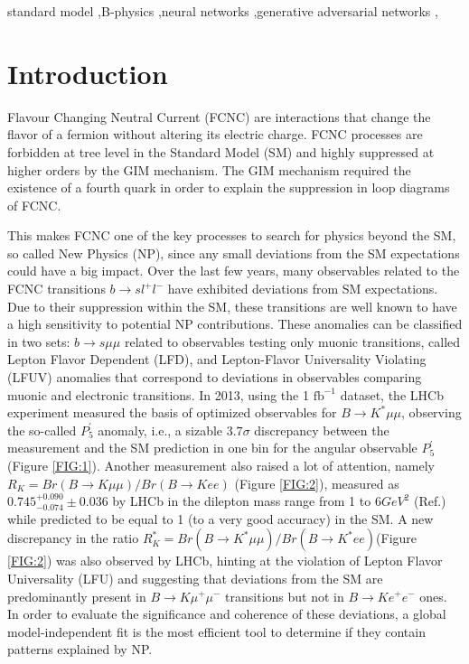 \documentclass[a4paper,fleqn]{cas-dc}
\begin{document}
\begin{keywords}
standard model \sep B-physics \sep neural networks \sep generative adversarial networks \sep
\end{keywords}


\maketitle

\section{Introduction}
Flavour Changing Neutral Current (FCNC) are interactions that change the flavor of a fermion without altering its electric charge. FCNC processes are forbidden at
tree level in the Standard Model (SM) and highly suppressed at higher orders by the GIM mechanism. The GIM mechanism  required the existence of a fourth quark in order to explain the suppression in loop diagrams of FCNC.

This makes FCNC one of the key processes to search for physics beyond the SM, so called New Physics (NP), since
any small deviations from the SM expectations could have
a big impact.
Over the last few years, many observables related
to the 
FCNC transitions \(b\rightarrow sl^+l^- \) have exhibited deviations from SM expectations. Due to their suppression within the SM, these transitions are well known to have a high sensitivity to potential NP contributions.
These anomalies can be classified in two sets: \(b\rightarrow s\mu\mu \)
related to observables testing only muonic transitions, called Lepton Flavor Dependent (LFD), and
Lepton-Flavor Universality Violating (LFUV) anomalies that correspond to deviations in observables comparing muonic and electronic transitions. In 2013, using
the 1 \(\text{fb}^{-1} \) dataset, the LHCb \cite{Aaij_2014} experiment measured the
basis of optimized observables  for \(B\rightarrow K^*\mu\mu\),
observing the so-called \(P^{\prime}_5 \)
anomaly, i.e., a sizable
\(3.7\sigma\) discrepancy between the measurement and the SM
prediction in one bin for the angular observable \(P^{\prime}_5 \) (Figure \ref{FIG:1}). Another measurement also raised a lot of attention, namely \(R_K = Br(B\rightarrow K\mu\mu)/ Br(B\rightarrow Kee)\) (Figure \ref{FIG:2}), measured as \(0.745^{+0.090}_{-0.074}\pm0.036  \) by LHCb in the dilepton mass range from 1 to \(6 GeV^2\) (Ref.\cite{Aaij_2014}) while predicted to be equal to 1 (to a very good accuracy) in the
SM. A new discrepancy
in the ratio \(R_K^* = Br(B\rightarrow K^*\mu\mu)/ Br(B\rightarrow K^*ee)\)(Figure \ref{FIG:2}) was also observed
by LHCb, hinting at the violation of Lepton
Flavor Universality (LFU) and suggesting that deviations
from the SM are predominantly present in \(B\rightarrow K\mu^+\mu^-\) transitions but not in \(B\rightarrow Ke^+e^-\) ones. In order to evaluate the significance and coherence of these deviations, a global model-independent fit is the most efficient tool to determine if
they contain patterns explained by NP. 
\end{document}
